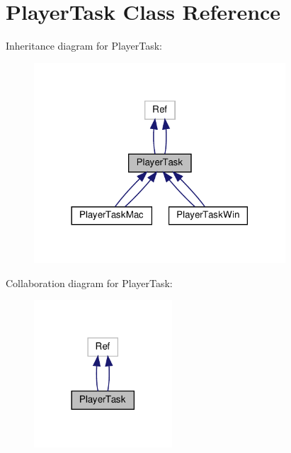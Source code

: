 \hypertarget{classPlayerTask}{}\section{Player\+Task Class Reference}
\label{classPlayerTask}


Inheritance diagram for Player\+Task\+:
\nopagebreak
\begin{figure}[H]
\begin{center}
\leavevmode
\includegraphics[width=266pt]{classPlayerTask__inherit__graph}
\end{center}
\end{figure}


Collaboration diagram for Player\+Task\+:
\nopagebreak
\begin{figure}[H]
\begin{center}
\leavevmode
\includegraphics[width=146pt]{classPlayerTask__coll__graph}
\end{center}
\end{figure}

